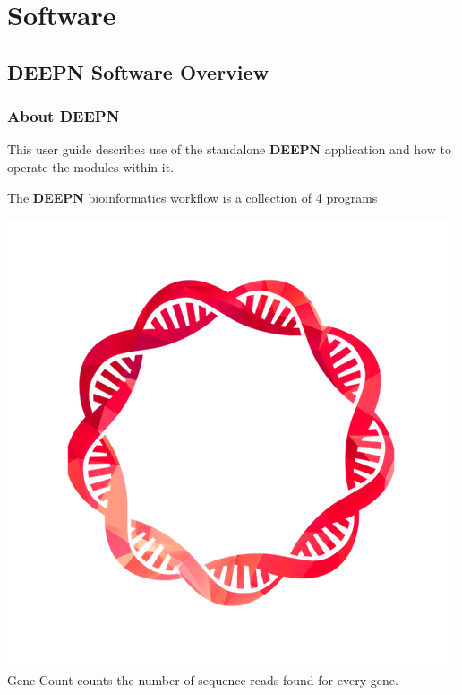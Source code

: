 \documentclass[11pt,fleqn]{book} %
\newcommand{\GeneCount}{{\color{Red} Gene Count }}
\newcommand{\DEEPN}{\textbf{DEEPN }}
\begin{document}

\part{Software}



\chapter{DEEPN Software Overview}

\section{About DEEPN}
This user guide describes use of the standalone \DEEPN application and how to operate the modules within it.

The \DEEPN bioinformatics workflow is a collection of 4 programs

\includegraphics[scale=0.3]{Pictures/gene_count.png} \GeneCount counts the number of sequence reads found for every gene.\\
\end{document}

